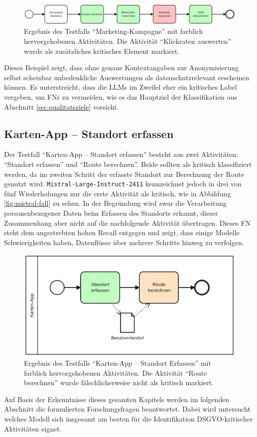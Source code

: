 \begin{figure}
    \centering
    \includegraphics[width=\textwidth]{images/results/examples/oss-20b-run-1-small-marketing}
    \caption{Ergebnis des Testfalls \enquote{Marketing-Kampagne} mit farblich hervorgehobenen Aktivitäten. Die Aktivität \enquote{Klickraten auswerten} wurde als zusätzliches kritisches Element markiert.}
    \label{fig:gptoss-fall}
\end{figure}

Dieses Beispiel zeigt, dass ohne genaue Kontextangaben zur Anonymisierung selbst scheinbar unbedenkliche Auswertungen als datenschutzrelevant erscheinen können. Es unterstreicht, dass die \acp{LLM} im Zweifel eher ein kritisches Label vergeben, um \acp{FN} zu vermeiden, wie es das Hauptziel der Klassifikation aus Abschnitt \ref{sec:qualitatsziele} vorsieht.

\subsection*{Karten-App – Standort erfassen}

Der Testfall \enquote{Karten-App – Standort erfassen} besteht aus zwei Aktivitäten: \enquote{Standort erfassen} und \enquote{Route berechnen}. Beide sollten als kritisch klassifiziert werden, da im zweiten Schritt der erfasste Standort zur Berechnung der Route genutzt wird. \texttt{Mistral-Large-Instruct-2411} kennzeichnet jedoch in drei von fünf Wiederholungen nur die erste Aktivität als kritisch, wie in Abbildung \autoref{fig:mistral-fall} zu sehen. In der Begründung wird zwar die Verarbeitung personenbezogener Daten beim Erfassen des Standorts erkannt, dieser Zusammenhang aber nicht auf die nachfolgende Aktivität übertragen. Dieses \ac{FN} steht dem angestrebten hohen Recall entgegen und zeigt, dass einige Modelle Schwierigkeiten haben, Datenflüsse über mehrere Schritte hinweg zu verfolgen.

\begin{figure}
    \centering
    \includegraphics[width=.55\textwidth]{images/results/examples/mistral-large-run-3-small-maps-app}
    \caption{Ergebnis des Testfalls \enquote{Karten-App – Standort Erfassen} mit farblich hervorgehobenen Aktivitäten. Die Aktivität \enquote{Route berechnen} wurde fälschlicherweise nicht als kritisch markiert.}
    \label{fig:mistral-fall}
\end{figure}

Auf Basis der Erkenntnisse dieses gesamten Kapitels werden im folgenden Abschnitt die formulierten Forschungsfragen beantwortet. Dabei wird untersucht welches Modell sich insgesamt am besten für die Identifikation \ac{DSGVO}‑kritischer Aktivitäten eignet.